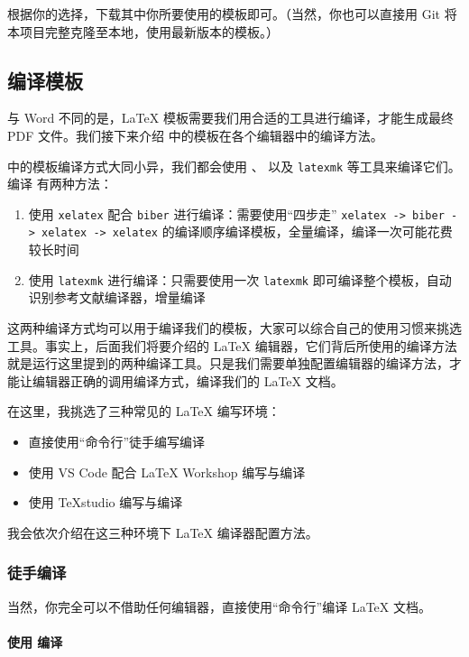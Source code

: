 根据你的选择，下载其中你所要使用的模板即可。（当然，你也可以直接用 Git 将本项目完整克隆至本地，使用最新版本的模板。）

\subsection{编译模板}

与 Word 不同的是，{\LaTeX} 模板需要我们用合适的工具进行编译，才能生成最终 PDF 文件。我们接下来介绍 {\BIThesis} 中的模板在各个编辑器中的编译方法。

{\BIThesis} 中的模板编译方式大同小异，我们都会使用 、 以及 \texttt{latexmk} 等工具来编译它们。编译 {\BIThesis} 有两种方法：

\begin{enumerate}
  \item 使用 \texttt{xelatex} 配合 \texttt{biber} 进行编译：需要使用“四步走” \texttt{xelatex -> biber -> xelatex -> xelatex} 的编译顺序编译模板，全量编译，编译一次可能花费较长时间
  \item 使用 \texttt{latexmk} 进行编译：只需要使用一次 \texttt{latexmk} 即可编译整个模板，自动识别参考文献编译器，增量编译
\end{enumerate}

这两种编译方式均可以用于编译我们的模板，大家可以综合自己的使用习惯来挑选工具。事实上，后面我们将要介绍的 {\LaTeX} 编辑器，它们背后所使用的编译方法就是运行这里提到的两种编译工具。只是我们需要单独配置编辑器的编译方法，才能让编辑器正确的调用编译方式，编译我们的 {\LaTeX} 文档。

在这里，我挑选了三种常见的 {\LaTeX} 编写环境：

\begin{itemize}
  \item 直接使用“命令行”徒手编写编译
  \item 使用 VS Code 配合 {\LaTeX} Workshop 编写与编译
  \item 使用 \TeX studio 编写与编译
\end{itemize}

我会依次介绍在这三种环境下 {\LaTeX} 编译器配置方法。

\subsubsection{徒手编译}

当然，你完全可以不借助任何编辑器，直接使用“命令行”编译 {\LaTeX} 文档。

\paragraph{使用  编译}

